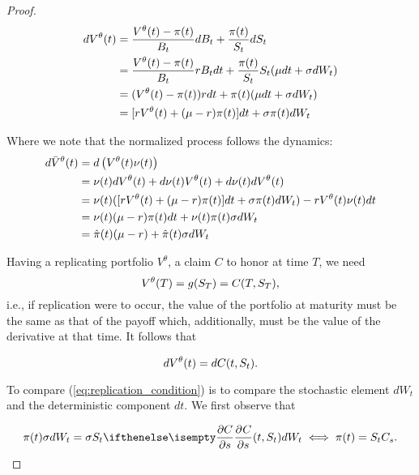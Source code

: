 \documentclass[../TGMAFFIRO.tex]{subfiles}
\begin{document}
\begin{proof}
	\begin{align}
		dV^\theta(t) &=  \frac{V^\theta(t) - \pi(t)}{B_t}dB_t + \frac{\pi(t)}{S_t} dS_t \nonumber\\
		&= \frac{V^\theta(t) - \pi(t)}{B_t} r B_t dt + \frac{\pi(t)}{S_t} S_t(\mu dt + \sigma dW_t)\nonumber\\
		&= (V^\theta(t) - \pi(t)) r dt  + \pi(t)(\mu dt + \sigma dW_t) 	\nonumber\\
		&= [rV^\theta(t) + (\mu - r) \pi(t)] dt + \sigma\pi(t) dW_t
	\end{align}
	
	Where we note that the normalized process follows the dynamics:
	\begin{align}
		d\bar{V}^\theta(t) &= d\left(V^\theta(t) \nu(t)\right) \nonumber \\
		&= \nu(t) dV^\theta(t) + d\nu(t) V^\theta(t) + d\nu(t) dV^\theta(t) \nonumber \\
		&= \nu(t)([rV^\theta(t) + (\mu - r) \pi(t)] dt + \sigma\pi(t) dW_t) - r V^\theta(t)\nu(t)dt\nonumber\\
		&= \nu(t)(\mu - r) \pi(t) dt + \nu(t)\pi(t) \sigma dW_t \nonumber \\
		&= \hat \pi(t) (\mu - r) + \hat \pi(t) \sigma dW_t
	\end{align}
	
	Having a replicating portfolio $V^\theta$, a claim $C$ to honor at time $T$, we need	
	\begin{equation}
		V^\theta(T) = g(S_T) = C(T, S_T),
	\end{equation}
	i.e., if replication were to occur, the value of the portfolio at maturity must be the same as that of the payoff which, additionally, must be the value of the derivative at that time. It follows that
	
	\begin{equation}\label{eq:replication_condition}
		dV^\theta(t) = dC(t, S_t).
	\end{equation}
	
	To compare (\ref{eq:replication_condition}) is to compare the stochastic element $dW_t$ and the deterministic component $dt$. We first observe that
	
	\begin{equation}
		\pi(t) \sigma dW_t = \sigma S_t \partialwrt{C}{s}{(t, S_t)}dW_t \iff \pi(t) = S_t C_s.
	\end{equation}
	

\end{proof}
\end{document}
